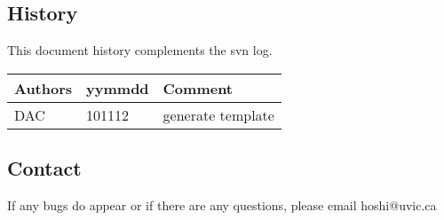 \subsection{History} 
This document history complements the svn log.

\begin{tabular*}{\textwidth}{lll}
\hline
Authors & yymmdd & Comment \\
\hline
DAC & 101112 & generate template \\

\hline
\end{tabular*}


\subsection{Contact}
If any bugs do appear or if there are any questions, please email hoshi@uvic.ca
\begin{verbatim}

\end{verbatim}


%
%
%
%
